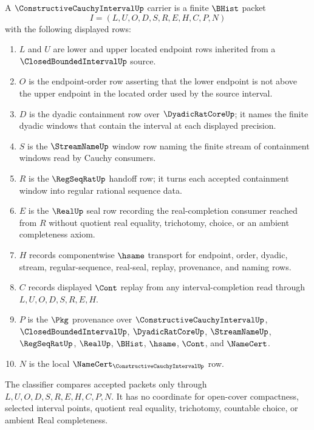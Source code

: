 \begin{definition}
\label{def:constructive-cauchy-interval-carrier}
A $\ConstructiveCauchyIntervalUp$ carrier is a finite $\BHist$ packet
$$
I=(L,U,O,D,S,R,E,H,C,P,N)
$$
with the following displayed rows:
\begin{enumerate}
\item $L$ and $U$ are lower and upper located endpoint rows inherited from a $\ClosedBoundedIntervalUp$ source.
\item $O$ is the endpoint-order row asserting that the lower endpoint is not above the upper endpoint in the located order used by the source interval.
\item $D$ is the dyadic containment row over $\DyadicRatCoreUp$; it names the finite dyadic windows that contain the interval at each displayed precision.
\item $S$ is the $\StreamNameUp$ window row naming the finite stream of containment windows read by Cauchy consumers.
\item $R$ is the $\RegSeqRatUp$ handoff row; it turns each accepted containment window into regular rational sequence data.
\item $E$ is the $\RealUp$ seal row recording the real-completion consumer reached from $R$ without quotient real equality, trichotomy, choice, or an ambient completeness axiom.
\item $H$ records componentwise $\hsame$ transport for endpoint, order, dyadic, stream, regular-sequence, real-seal, replay, provenance, and naming rows.
\item $C$ records displayed $\Cont$ replay from any interval-completion read through $L,U,O,D,S,R,E,H$.
\item $P$ is the $\Pkg$ provenance over $\ConstructiveCauchyIntervalUp$, $\ClosedBoundedIntervalUp$, $\DyadicRatCoreUp$, $\StreamNameUp$, $\RegSeqRatUp$, $\RealUp$, $\BHist$, $\hsame$, $\Cont$, and $\NameCert$.
\item $N$ is the local $\NameCert_{\ConstructiveCauchyIntervalUp}$ row.
\end{enumerate}
The classifier compares accepted packets only through $L,U,O,D,S,R,E,H,C,P,N$. It has no coordinate for open-cover compactness, selected interval points, quotient real equality, trichotomy, countable choice, or ambient Real completeness.
\end{definition}

